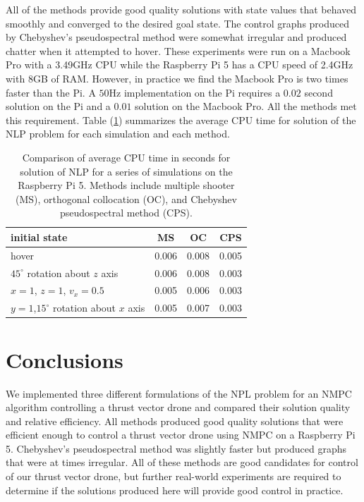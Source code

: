 \documentclass[]{article}
\begin{document}

All of the methods provide good quality solutions with state values that behaved smoothly and converged to the desired goal state.  The control graphs produced by Chebyshev's pseudospectral method were somewhat irregular and produced chatter when it attempted to hover.  These experiments were run on a Macbook Pro with a 3.49GHz CPU while the Raspberry Pi 5 has a CPU speed of 2.4GHz with 8GB of RAM.  However, in practice we find the Macbook Pro is two times faster than the Pi.  A $50$Hz implementation on the Pi requires  a $0.02$ second solution on the Pi and a $0.01$ solution on the Macbook Pro. All the methods met this requirement. Table (\ref{table:CPU}) summarizes the average CPU time for solution of the NLP problem for each simulation and each method.  


\begin{table}[h!]	
	\begin{center}
		\begin{tabular}{ | l | c | c | c | } 
			\hline
			initial state & MS & OC & CPS \\
			\hline
			hover &            0.006  & 0.008    & 0.005 \\ 
			$45^{\circ}$ rotation about $z$ axis &   0.006 & 0.008 &   0.003 \\ 
			$x = 1$, $z=1$, $v_x = 0.5$  &        0.005  & 0.006          &  0.003 \\ 
			$y = 1$,$15^{\circ}$ rotation about $x$ axis &      0.005 & 0.007          & 0.003 \\
			\hline
		\end{tabular}
		\caption{Comparison of average CPU time in seconds for solution of NLP for a series of  simulations on the Raspberry Pi 5. Methods include  multiple shooter (MS), orthogonal collocation (OC), and Chebyshev pseudospectral method (CPS). }
		\label{table:CPU}
	\end{center}

\end{table}


\section*{Conclusions}
We implemented three different formulations of the NPL problem for an NMPC algorithm controlling a thrust vector drone and compared their solution quality and relative efficiency. All methods produced good quality solutions that were efficient enough to control a thrust  vector drone using NMPC  on a Raspberry Pi 5.  Chebyshev's pseudospectral method was slightly faster but produced graphs that were at times irregular.   All of these methods are good candidates for control of our thrust vector drone, but further real-world experiments are required to determine if the solutions produced here will provide good control in practice.


	
	
%	


\end{document}
